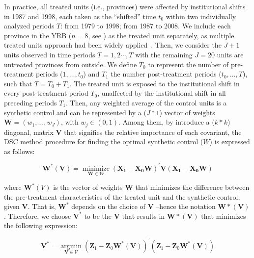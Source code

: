 \documentclass[preprint, 12pt]{elsarticle}
\begin{document}
In practice, all treated units (i.e., provinces) were affected by institutional shifts in 1987 and 1998, each taken as the ``shifted'' time $t_0$ within two individually analyzed periods $T$: from 1979 to 1998; from 1987 to 2008.
We include each province in the YRB ($n=8$, see \textit{}) as the treated unit separately, as multiple treated units approach had been widely applied~\cite{abadie2021}.
Then, we consider the $J+1$ units observed in time periods $T = {1,2 \cdots , T}$ with the remaining $J=20$ units are untreated provinces from outside.
We define $T_0$ to represent the number of pre-treatment periods ($1,\ldots,t_0$) and $T_1$ the number post-treatment periods ($t_0, \ldots, T$), such that $T = T_0+ T_1$.
The treated unit is exposed to the institutional shift in every post-treatment period $T_0$, unaffected by the institutional shift in all preceding periods $T_1$.
Then, any weighted average of the control units is a synthetic control and can be represented by a ($J * 1$) vector of weights $\mathbf{W} = (w_{1}, \ldots ,w_{J})$, with $w_j \in (0, 1)$.
Among them, by introduce a ($k * k$) diagonal, matrix $\mathbf{V}$ that signifies the relative importance of each covariant, the DSC method procedure for finding the optimal synthetic control ($W$) is expressed as follows:

\begin{equation}
    \mathbf{W^{*}(V)}=\underset{\mathbf{W} \in \mathcal{W}}{\operatorname{minimize}}\left(\mathbf{X}_{\mathbf{1}}-\mathbf{X}_{\mathbf{0}} \mathbf{W}\right)^{\prime} \mathbf{V}\left(\mathbf{X}_{\mathbf{1}}-\mathbf{X}_{\mathbf{0}} \mathbf{W}\right)
\end{equation}

where $\mathbf{W}^{*}(V)$ is the vector of weights $\mathbf{W}$ that minimizes the difference between the pre-treatment characteristics of the treated unit and the synthetic control, given $\mathbf{V}$. That is, $\mathbf{W^{*}}$ depends on the choice of $\mathbf{V}$ –hence the notation $\mathbf{W*(V)}$. Therefore, we choose $\mathbf{V^{*}}$ to be the $\mathbf{V}$ that results in $\mathbf{W*(V)}$ that minimizes the following expression:

\begin{equation}
    \mathbf{V}^{*}=\underset{\mathbf{V} \in \mathcal{V}}{\operatorname{argmin}}\left(\mathbf{Z}_{1}-\mathbf{Z}_{0} \mathbf{W}^{*}(\mathbf{V})\right)^{\prime}\left(\mathbf{Z}_{1}-\mathbf{Z}_{0} \mathbf{W}^{*}(\mathbf{V})\right)
\end{equation}
\end{document}
